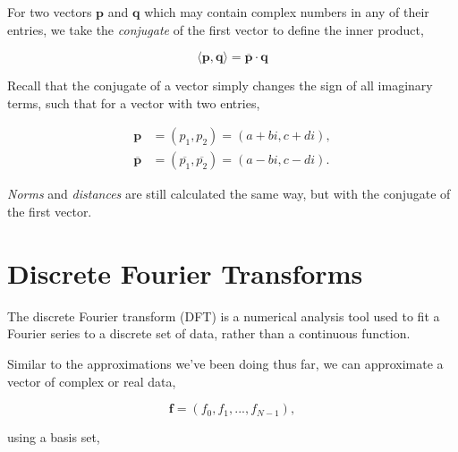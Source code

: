\documentclass[12pt]{article}
\begin{document}
\vspace{4mm}

For two vectors $\mathbf{p}$ and $\mathbf{q}$ which may contain complex numbers in any of their entries, we take the \textit{conjugate} of the first vector to define the inner product,

\vspace{2mm}

$$ \langle \mathbf{p},\mathbf{q} \rangle = \overline{\mathbf{p}} \cdot \mathbf{q} $$

\vspace{4mm}

Recall that the conjugate of a vector simply changes the sign of all imaginary terms, such that for a vector with two entries,

\vspace{2mm}

\begin{align*}
\mathbf{p} &= (p_1,p_2) = (a + bi, c + di),\\[1em]
\overline{\mathbf{p}} &= (\overline{p_1},\overline{p_2}) = (a - bi, c - di).
\end{align*}

\vspace{4mm}

\textit{Norms} and \textit{distances} are still calculated the same way, but with the conjugate of the first vector.

\newpage

\section{Discrete Fourier Transforms}

\vspace{4mm}

The discrete Fourier transform (DFT) is a numerical analysis tool used to fit a Fourier series to a discrete set of data, rather than a continuous function.

\vspace{4mm}

Similar to the approximations we've been doing thus far, we can approximate a vector of complex or real data,

\vspace{2mm}

$$ \mathbf{f} = (f_0,f_1,...,f_{N-1}), $$

\vspace{4mm}

using a basis set,
\end{document}
